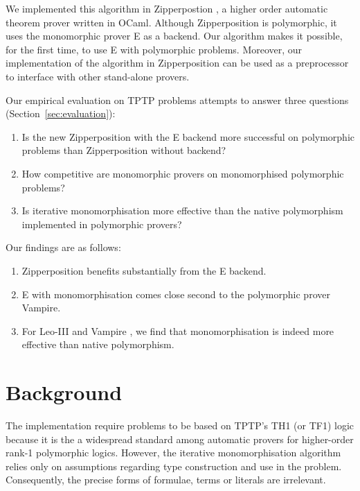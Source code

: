 \documentclass[]{ceurart}
\begin{document}
\bigskip

We implemented this algorithm in Zipperpostion \cite{zipp}, a higher order automatic theorem prover written in OCaml. Although Zipperposition is polymorphic, it uses the monomorphic prover E \cite{e} as a backend. Our algorithm makes it possible, for the first time, to use E with polymorphic problems. Moreover, our implementation of the algorithm in Zipperposition can be used as a preprocessor to interface with other stand-alone provers.

Our empirical evaluation on TPTP problems \cite{tptp} attempts to answer three questions (Section~\ref{sec:evaluation}):
%
\begin{enumerate}
\item Is the new Zipperposition with the E backend more successful on polymorphic problems than Zipperposition without backend?

\item How competitive are monomorphic provers on monomorphised polymorphic problems?

\item Is iterative monomorphisation more effective than the native polymorphism implemented in polymorphic provers?
\end{enumerate}

Our findings are as follows:
%
\begin{enumerate}
\item Zipperposition benefits substantially from the E backend.

\item E with monomorphisation comes close second to the polymorphic prover Vampire.

\item For Leo-III \cite{leo-iii} and Vampire \cite{vamp}, we find that monomorphisation is indeed more effective than native polymorphism.
\end{enumerate}

\section{Background}
\label{sec:background}

The implementation require problems to be based on TPTP's TH1 (or TF1) logic \cite{th1} because it is the a widespread standard among automatic provers for higher-order rank-1 polymorphic logics. However, the iterative monomorphisation algorithm relies only on assumptions regarding type construction and use in the problem. Consequently, the precise forms of formulae, terms or literals are irrelevant.
\end{document}
